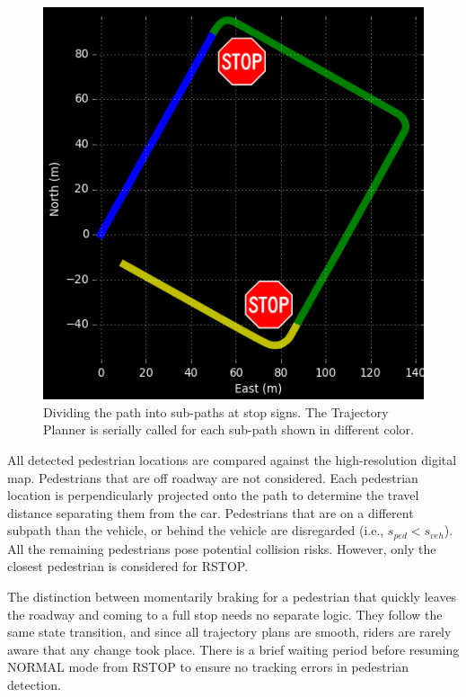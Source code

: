 \documentclass[letterpaper, 10 pt, conference]{ieeeconf}  %
\begin{document}
\begin{figure}[tb]
  \centering
  \includegraphics[width=0.4\columnwidth]{graphics/Subpaths.png}
  \caption{
    Dividing the path into sub-paths at stop signs.
    The Trajectory Planner is serially called for each sub-path shown in different color.
  }
  \label{fig:subpathdivision}
\end{figure}

All detected pedestrian locations are compared against the high-resolution digital map. Pedestrians that are off roadway are not considered.
Each pedestrian location is perpendicularly projected onto the path to determine the travel distance separating them from the car.
Pedestrians that are on a different subpath than the vehicle, or behind the vehicle are disregarded (i.e., $s_{ped} < s_{veh}$).
All the remaining pedestrians pose potential collision risks. However, only the closest pedestrian is considered for RSTOP.

The distinction between momentarily braking for a pedestrian that quickly leaves the roadway and coming to a full stop needs no separate logic.
They follow the same state transition, and since all trajectory plans are smooth, riders are rarely aware that any change took place.
There is a brief waiting period before resuming NORMAL mode from RSTOP to ensure no tracking errors in pedestrian detection.
\end{document}
